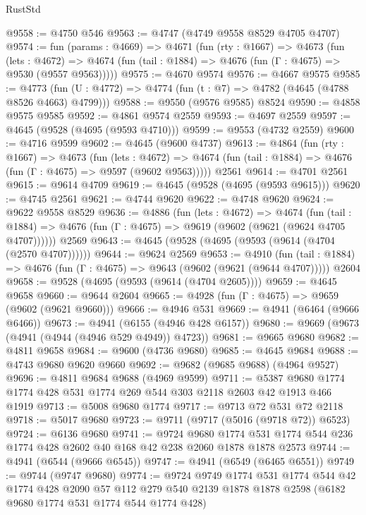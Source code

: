 \begin{lexlean}{RustStd}
\begin{coremodule}
@9558 := @4750 @546
@9563 := @4747 (@4749 @9558 @8529 @4705 @4707)
@9574 := fun (params : @4669) =>
  @4671
    (fun (rty : @1667) =>
    @4673
      (fun (lets : @4672) =>
      @4674 (fun (tail : @1884) => @4676 (fun (Γ : @4675) => @9530 (@9557 @9563)))))
@9575 := @4670 @9574
@9576 := @4667 @9575
@9585 := @4773 (fun (U : @4772) => @4774 (fun (t : @7) => @4782 (@4645 (@4788 @8526 @4663) @4799)))
@9588 := @9550 (@9576 @9585) @8524
@9590 := @4858 @9575 @9585
@9592 := @4861 @9574 @2559
@9593 := @4697 @2559
@9597 := @4645 (@9528 (@4695 (@9593 @4710)))
@9599 := @9553 (@4732 @2559)
@9600 := @4716 @9599
@9602 := @4645 (@9600 @4737)
@9613 := @4864
    (fun (rty : @1667) =>
    @4673
      (fun (lets : @4672) =>
      @4674 (fun (tail : @1884) => @4676 (fun (Γ : @4675) => @9597 (@9602 @9563)))))
    @2561
@9614 := @4701 @2561
@9615 := @9614 @4709
@9619 := @4645 (@9528 (@4695 (@9593 @9615)))
@9620 := @4745 @2561
@9621 := @4744 @9620
@9622 := @4748 @9620
@9624 := @9622 @9558 @8529
@9636 := @4886
    (fun (lets : @4672) =>
    @4674
      (fun (tail : @1884) => @4676 (fun (Γ : @4675) => @9619 (@9602 (@9621 (@9624 @4705 @4707))))))
    @2569
@9643 := @4645 (@9528 (@4695 (@9593 (@9614 (@4704 (@2570 @4707))))))
@9644 := @9624 @2569
@9653 := @4910
    (fun (tail : @1884) => @4676 (fun (Γ : @4675) => @9643 (@9602 (@9621 (@9644 @4707)))))
    @2604
@9658 := @9528 (@4695 (@9593 (@9614 (@4704 @2605))))
@9659 := @4645 @9658
@9660 := @9644 @2604
@9665 := @4928 (fun (Γ : @4675) => @9659 (@9602 (@9621 @9660)))
@9666 := @4946 @531
@9669 := @4941 (@6464 (@9666 @6466))
@9673 := @4941 (@6155 (@4946 @428 @6157))
@9680 := @9669 (@9673 (@4941 (@4944 (@4946 @529 @4949)) @4723))
@9681 := @9665 @9680
@9682 := @4811 @9658
@9684 := @9600 (@4736 @9680)
@9685 := @4645 @9684
@9688 := @4743 @9680 @9620 @9660
@9692 := @9682 (@9685 @9688) (@4964 @9527)
@9696 := @4811 @9684 @9688 (@4969 @9599)
@9711 := @5387 @9680 @1774 @1774 @428 @531 @1774 @269 @544 @303 @2118 @2603 @42 @1913 @466 @1919
@9713 := @5008 @9680 @1774
@9717 := @9713 @72 @531 @72 @2118
@9718 := @5017 @9680
@9723 := @9711 (@9717 (@5016 (@9718 @72)) @6523)
@9724 := @6136 @9680
@9741 := @9724
    @9680
    @1774
    @531
    @1774
    @544
    @236
    @1774
    @428
    @2602
    @40
    @168
    @42
    @238
    @2060
    @1878
    @1878
    @2573
@9744 := @4941 (@6544 (@9666 @6545))
@9747 := @4941 (@6549 (@6465 @6551))
@9749 := @9744 (@9747 @9680)
@9774 := @9724
    @9749
    @1774
    @531
    @1774
    @544
    @42
    @1774
    @428
    @2090
    @57
    @112
    @279
    @540
    @2139
    @1878
    @1878
    @2598
    (@6182 @9680 @1774 @531 @1774 @544 @1774 @428)

\end{coremodule}
\end{lexlean}

